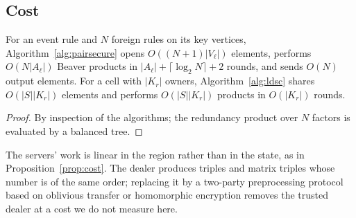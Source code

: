 \subsection{Cost}\label{sec:cost}
\begin{proposition}[Communication]\label{prop:comm}
For an event rule and $N$ foreign rules on its key vertices, Algorithm~\ref{alg:pairsecure} opens $O((N+1)|V_\ell|)$ elements, performs $O(N|A_\ell|)$ Beaver products in $|A_\ell| + \lceil \log_2 N \rceil + 2$ rounds, and sends $O(N)$ output elements. For a cell with $|K_r|$ owners, Algorithm~\ref{alg:ldsc} shares $O(|S||K_r|)$ elements and performs $O(|S||K_r|)$ products in $O(|K_r|)$ rounds.
\end{proposition}
\begin{proof}
By inspection of the algorithms; the redundancy product over $N$ factors is evaluated by a balanced tree.
\end{proof}
The servers' work is linear in the region rather than in the state, as in Proposition~\ref{prop:cost}. The dealer produces triples and matrix triples whose number is of the same order; replacing it by a two-party preprocessing protocol based on oblivious transfer or homomorphic encryption removes the trusted dealer at a cost we do not measure here.
